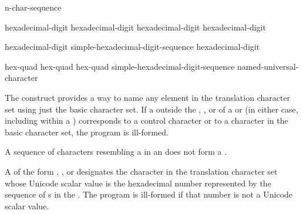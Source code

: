 \begin{bnf}
\br
     n-char-sequence \terminal{\}}
\end{bnf}

\begin{bnf}
\br
    hexadecimal-digit hexadecimal-digit hexadecimal-digit hexadecimal-digit
\end{bnf}

\begin{bnf}
\br
    hexadecimal-digit\br
    simple-hexadecimal-digit-sequence hexadecimal-digit
\end{bnf}

\begin{bnf}
\br
     hex-quad\br
     hex-quad hex-quad\br
     simple-hexadecimal-digit-sequence \terminal{\}}\br
    named-universal-character
\end{bnf}

\pnum
The  construct provides a way to name any
element in the translation character set using just the basic character set.
If a  outside
the , , or
 of a  or
(in either case, including within a )
corresponds to a control character or to a character in the basic character set,
the program is ill-formed.
\begin{note}
A sequence of characters resembling a  in an
 does not form a
.
\end{note}

\pnum
A 
of the form  ,
  , or
designates the character in the translation character set
whose Unicode scalar value is the hexadecimal number represented by
the sequence of s
in the .
The program is ill-formed if that number is not a Unicode scalar value.

